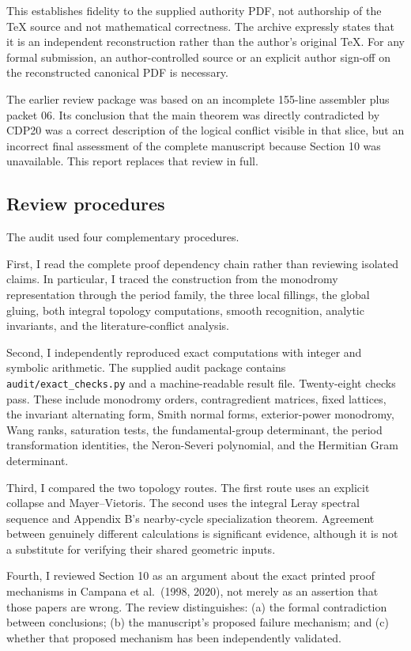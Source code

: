 \documentclass[
  10pt,
  letterpaper,
]{article}
\begin{document}
This establishes fidelity to the supplied authority PDF, not authorship
of the TeX source and not mathematical correctness. The archive
expressly states that it is an independent reconstruction rather than
the author's original TeX. For any formal submission, an
author-controlled source or an explicit author sign-off on the
reconstructed canonical PDF is necessary.

The earlier review package was based on an incomplete 155-line assembler
plus packet 06. Its conclusion that the main theorem was directly
contradicted by CDP20 was a correct description of the logical conflict
visible in that slice, but an incorrect final assessment of the complete
manuscript because Section 10 was unavailable. This report replaces that
review in full.

\subsection{Review procedures}\label{review-procedures}

The audit used four complementary procedures.

First, I read the complete proof dependency chain rather than reviewing
isolated claims. In particular, I traced the construction from the
monodromy representation through the period family, the three local
fillings, the global gluing, both integral topology computations, smooth
recognition, analytic invariants, and the literature-conflict analysis.

Second, I independently reproduced exact computations with integer and
symbolic arithmetic. The supplied audit package contains
\texttt{audit/exact\_checks.py} and a machine-readable result file.
Twenty-eight checks pass. These include monodromy orders, contragredient
matrices, fixed lattices, the invariant alternating form, Smith normal
forms, exterior-power monodromy, Wang ranks, saturation tests, the
fundamental-group determinant, the period transformation identities, the
Neron-Severi polynomial, and the Hermitian Gram determinant.

Third, I compared the two topology routes. The first route uses an
explicit collapse and Mayer--Vietoris. The second uses the integral
Leray spectral sequence and Appendix B's nearby-cycle specialization
theorem. Agreement between genuinely different calculations is
significant evidence, although it is not a substitute for verifying
their shared geometric inputs.

Fourth, I reviewed Section 10 as an argument about the exact printed
proof mechanisms in Campana et al.~(1998, 2020), not merely as an
assertion that those papers are wrong. The review distinguishes: (a) the
formal contradiction between conclusions; (b) the manuscript's proposed
failure mechanism; and (c) whether that proposed mechanism has been
independently validated.
\end{document}
